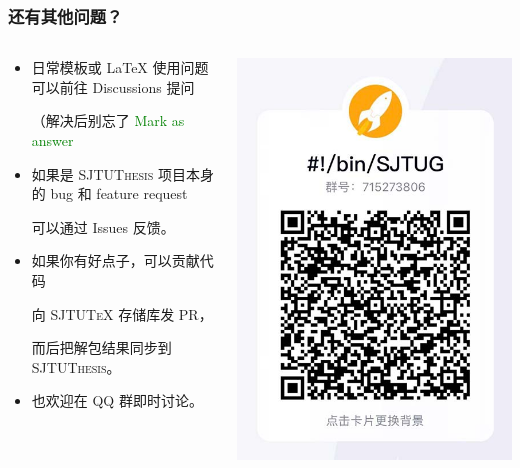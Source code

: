 \begin{frame}
  \frametitle{还有其他问题？}
  \begin{columns}
    \begin{column}{0.73\textwidth}
      \begin{itemize}
        \item[{\faComment*[regular]}] 日常模板或 \LaTeX{} 使用问题可以前往 Discussions  提问

        （解决后别忘了 \textcolor{green}{\faCheckCircle{} Mark as answer}
        \item[{\faDotCircle[regular]}] 如果是 \textsc{SJTUThesis} 项目本身的 bug 和 feature request

        可以通过 Issues  反馈。
        \item[{\faCodeBranch}] 如果你有好点子，可以贡献代码

          向 \textsc{SJTU\TeX{}}  存储库发 PR，\par
          而后把解包结果同步到 \textsc{SJTUThesis}。
        
        \item[{\faQq}] 也欢迎在 QQ 群即时讨论。
      \end{itemize}
    \end{column}
    \begin{column}{0.27\textwidth}
      \includegraphics[height=0.7\textheight]{support/images/qq.jpg}
    \end{column}
  \end{columns}
\end{frame}
